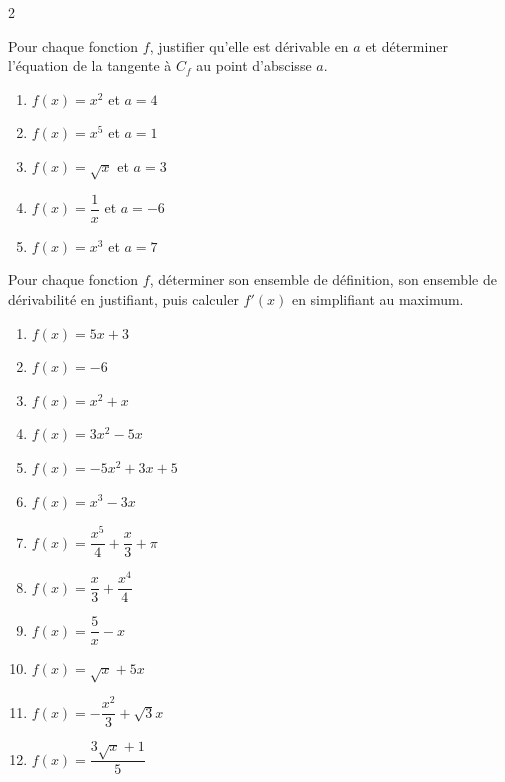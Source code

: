 \documentclass[a4paper,12pt]{article}
\begin{document}
\begin{multicols}{2}
\begin{exercice}[title=Exercice 12 $\quad \star \quad$ { [Représenter, Calculer] }]{}{}
    Pour chaque fonction $f$, justifier qu’elle est dérivable en $a$ et déterminer l’équation de la tangente à $C_f$ au point d’abscisse $a$.
    \begin{enumerate}
        \item $f(x) = x^2$ et $a = 4$
        \item $f(x) = x^5$ et $a = 1$
        \item $f(x) = \sqrt{x}$ et $a = 3$
        \item $f(x) = \dfrac{1}{x}$ et $a = -6$
        \item $f(x) = x^3$ et $a = 7$
    \end{enumerate}
    \end{exercice}
    
    \begin{exercice}[title=Exercice 13 $\quad \star \quad$ { [Calculer] }]{}{}
    Pour chaque fonction $f$, déterminer son ensemble de définition, son ensemble de dérivabilité en justifiant, puis calculer $f'(x)$ en simplifiant au maximum.
    \begin{enumerate}
        \item $f(x) = 5x + 3$
        \item $f(x) = -6$
        \item $f(x) = x^2 + x$
        \item $f(x) = 3x^2 - 5x$
        \item $f(x) = -5x^2 + 3x + 5$
        \item $f(x) = x^3 - 3x$
        \item $f(x) = \dfrac{x^5}{4} + \dfrac{x}{3} + \pi$
        \item $f(x) = \dfrac{x}{3} + \dfrac{x^4}{4}$
        \item $f(x) = \dfrac{5}{x} - x$
        \item $f(x) = \sqrt{x} + 5x$
        \item $f(x) = -\dfrac{x^2}{3} + \sqrt{3}x$
        \item $f(x) = \dfrac{3\sqrt{x}+1}{5}$
    \end{enumerate}
    \end{exercice}
    

\end{multicols}
\end{document}
